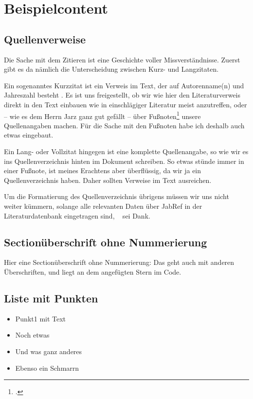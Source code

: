 \chapter{Beispielcontent}

\section{Quellenverweise}

Die Sache mit dem Zitieren ist eine Geschichte voller Missverständnisse. Zuerst gibt es da nämlich die Unterscheidung zwischen Kurz- und Langzitaten.

Ein sogenanntes Kurzzitat ist ein Verweis im Text, der auf Autorenname(n) und Jahreszahl besteht . Es ist uns freigestellt, ob wir wie hier den Literaturverweis direkt in den Text einbauen wie in einschlägiger Literatur meist anzutreffen\cites[S.72]{BIBTEXKEYBook}, oder -- wie es dem Herrn Jarz ganz gut gefällt -- über Fußnoten\footcites[S.39]{BIBTEXKEYarticle} unsere Quellenangaben machen. Für die Sache mit den Fußnoten habe ich deshalb auch etwas eingebaut.

Ein Lang- oder Vollzitat hingegen ist eine komplette Quellenangabe, so wie wir es ins Quellenverzeichnis hinten im Dokument schreiben. So etwas stünde immer in einer Fußnote, ist meines Erachtens aber überflüssig, da wir ja ein Quellenverzeichnis haben. Daher sollten Verweise im Text ausreichen.

Um die Formatierung des Quellenverzeichnis übrigens müssen wir uns nicht weiter kümmern, solange alle relevanten Daten über JabRef in der Literaturdatenbank eingetragen sind, \BibTeX~ sei Dank.


\section*{Sectionüberschrift ohne Nummerierung}
Hier eine Sectionüberschrift ohne Nummerierung: Das geht auch mit anderen Überschriften, und liegt an dem angefügten Stern im Code.


\section{Liste mit Punkten}
\begin{itemize}
\item Punkt1 mit Text
\item Noch etwas
\item Und was ganz anderes
\item Ebenso ein Schmarrn
\end{itemize}


